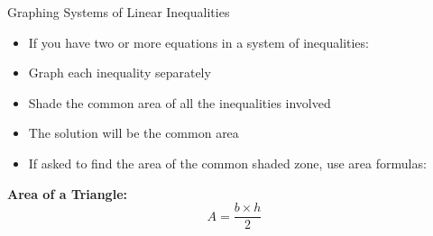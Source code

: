 \documentclass[aspectratio=169]{beamer}
\begin{document}
\begin{frame}{Graphing Systems of Linear Inequalities}
    \begin{tcolorbox}[colback=lightgray,colframe=primary,title=Systems of Linear Inequalities]
        \footnotesize
        \begin{itemize}
            \item If you have two or more equations in a system of inequalities:
            \item Graph each inequality separately
            \item Shade the common area of all the inequalities involved
            \item The solution will be the common area
            \item If asked to find the area of the common shaded zone, use area formulas:
        \end{itemize}
    \end{tcolorbox}
    \vspace{0.5em}
    \textbf{Area of a Triangle:}
    \[
        A = \frac{b \times h}{2}
    \]
    \begin{center}
    \end{center}
\end{frame}
\end{document}
